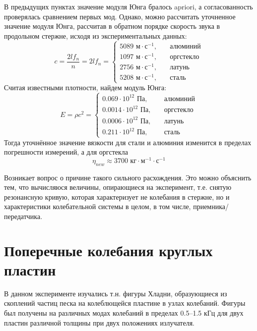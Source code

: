 В предыдущих пунктах значение модуля Юнга бралось apriori, а согласованность проверялась сравнением первых мод. Однако, можно рассчитать уточненное значение модуля Юнга, рассчитав в обратном порядке скорость звука в продольном стержне, исходя из экспериментальных данных:
\begin{equation}
	c=\frac{2l f_n}{n}=2lf_n=
	\left\{
	\begin{aligned}
		5089 \text{ м}\cdot\text{с}^{-1},&\quad \text{алюминий}\\
		1097 \text{ м}\cdot\text{с}^{-1},&\quad \text{оргстекло}\\
		2756 \text{ м}\cdot\text{с}^{-1},&\quad \text{латунь}\\
		5208 \text{ м}\cdot\text{с}^{-1},&\quad \text{сталь}
	\end{aligned}
	\right.
\end{equation}
Считая известными плотности, найдем модуль Юнга:
\begin{equation}
	E = \rho c^2=
	\left\{
	\begin{aligned}
		0.069\cdot 10^{12}\text{ Па},&\quad \text{алюминий}\\
		0.0014\cdot 10^{12}\text{ Па},&\quad \text{оргстекло}\\
		0.0006\cdot 10^{12}\text{ Па},&\quad \text{латунь}\\
		0.211\cdot 10^{12}\text{ Па},&\quad \text{сталь}
	\end{aligned}
	\right.
\end{equation}
Тогда уточнённое значение вязкости для стали и алюминия изменится в пределах погрешности измерений, а для оргстекла
\begin{equation}
	\eta_{new}\approx 3700 \text{ кг}\cdot\text{м}^{-1}\cdot\text{с}^{-1}
\end{equation}

Возникает вопрос о причине такого сильного расхождения. Это можно объяснить тем, что вычисляюся величины, опирающиеся на эксперимент, т.е. снятую резонансную кривую, которая характеризует не колебания в стержне, но и характеристики колебательной системы в целом, в том числе, приемника/передатчика.

\newpage

\section{Поперечные колебания круглых пластин}

В данном эксперименте изучались т.н. фигуры Хладни, образующиеся из скоплений частиц песка на колеблющейся пластине в узлах колебаний. Фигуры был получены на различных модах колебаний в пределах 0.5--1.5 кГц для двух пластин различной толщины при двух положениях излучателя.

